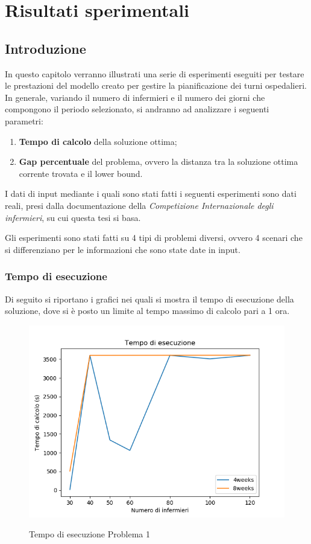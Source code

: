 \chapter{Risultati sperimentali}\label{ch:chapter3}

\section{Introduzione}
In questo capitolo verranno illustrati una serie di esperimenti eseguiti per testare le prestazioni del modello creato per gestire la pianificazione dei turni ospedalieri.
In generale, variando il numero di infermieri e il numero dei giorni che compongono il periodo selezionato, si andranno ad analizzare i seguenti parametri:
\begin{enumerate}
\item \textbf{Tempo di calcolo} della soluzione ottima;
\item \textbf{Gap percentuale} del problema, ovvero la distanza tra la soluzione ottima corrente trovata e il lower bound.
\end{enumerate}

I dati di input mediante i quali sono stati fatti i seguenti esperimenti sono dati reali, presi dalla documentazione della \textit{Competizione Internazionale degli infermieri}, su cui questa tesi si basa. 

Gli esperimenti sono stati fatti su 4 tipi di problemi diversi, ovvero 4 scenari che si differenziano per le informazioni che sono state date in input.

\subsection{Tempo di esecuzione}
Di seguito si riportano i grafici nei quali si mostra il tempo di esecuzione della soluzione,
dove si è posto un limite al tempo massimo di calcolo pari a 1 ora.
\begin{figure}[H]
\begin{center}
  \includegraphics[scale=0.5]{img/Problema1/Time_1h-h0_w0.png}\\
  \caption{Tempo di esecuzione Problema 1}
\end{center}
\end{figure}

